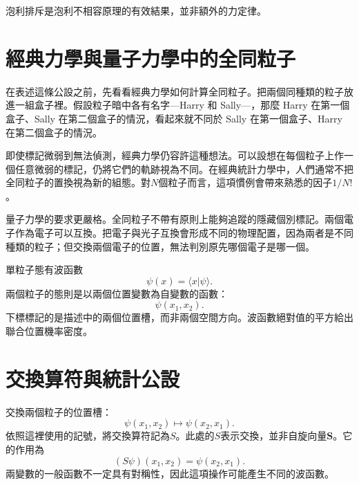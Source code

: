 泡利排斥是泡利不相容原理的有效結果，並非額外的力定律。

\begin{classroomqa}
\end{classroomqa}

\section{經典力學與量子力學中的全同粒子}

在表述這條公設之前，先看看經典力學如何計算全同粒子。把兩個同種類的粒子放進一組盒子裡。假設粒子暗中各有名字---Harry 和 Sally---，那麼 Harry 在第一個盒子、Sally 在第二個盒子的情況，看起來就不同於 Sally 在第一個盒子、Harry 在第二個盒子的情況。

即使標記微弱到無法偵測，經典力學仍容許這種想法。可以設想在每個粒子上作一個任意微弱的標記，仍將它們的軌跡視為不同。在經典統計力學中，人們通常不把全同粒子的置換視為新的組態。對\(N\)個粒子而言，這項慣例會帶來熟悉的因子\(1/N!\)。

量子力學的要求更嚴格。全同粒子不帶有原則上能夠追蹤的隱藏個別標記。兩個電子作為電子可以互換。把電子與光子互換會形成不同的物理配置，因為兩者是不同種類的粒子；但交換兩個電子的位置，無法判別原先哪個電子是哪一個。

單粒子態有波函數
\[
\psi(x)=\langle x\vert\psi\rangle.
\]
兩個粒子的態則是以兩個位置變數為自變數的函數：
\begin{equation}
\psi(x_{1},x_{2}).
\end{equation}
下標標記的是描述中的兩個位置槽，而非兩個空間方向。波函數絕對值的平方給出聯合位置機率密度。

\section{交換算符與統計公設}

交換兩個粒子的位置槽：
\begin{equation}
\psi(x_{1},x_{2})\longmapsto\psi(x_{2},x_{1}).
\end{equation}
依照這裡使用的記號，將交換算符記為\(S\)。此處的\(S\)表示交換，並非自旋向量\(\mathbf S\)。它的作用為
\begin{equation}
(S\psi)(x_{1},x_{2})=\psi(x_{2},x_{1}).
\end{equation}
兩變數的一般函數不一定具有對稱性，因此這項操作可能產生不同的波函數。

